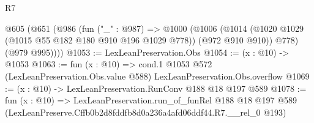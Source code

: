 \begin{lexlean}{R7}
\begin{coremodule}
  @605
    (@651
      (@986
        (fun ("_" : @987) =>
        @1000
          (@1006
            (@1014 (@1020 @1029 (@1015 @55 @182 @180 @910 @196 @1029 @778)) (@972 @910 @910))
            @778)
          (@979 @995))))
@1053 := LexLeanPreservation.Obs
@1054 := (x : @10) -> @1053
@1063 := fun (x : @10) =>
  cond.{1} @1053 @572 (LexLeanPreservation.Obs.value @588) LexLeanPreservation.Obs.overflow
@1069 := (x : @10) -> LexLeanPreservation.RunConv @188 @18 @197 @589
@1078 := fun (x : @10) =>
  LexLeanPreservation.run_of_funRel
    @188
    @18
    @197
    @589
    (LexLeanPreserve.Cffb0b2d8fddfb8d0a236a4afd06ddf44.R7.__rel_0 @193)
\end{coremodule}
\end{lexlean}
